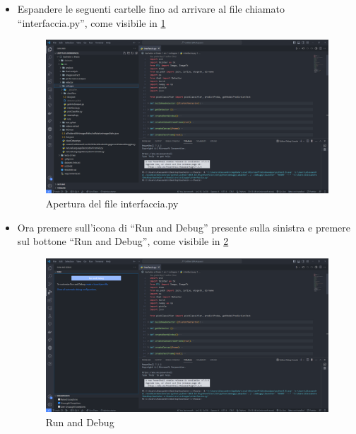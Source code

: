 \begin{itemize}
\item Espandere le seguenti cartelle fino ad arrivare al file chiamato “interfaccia.py”, come visibile in \ref{img:5}
\begin{figure}
    \begin{center}    
        \includegraphics[width=0.72\linewidth]{images/image5.png}
        \caption{Apertura del file interfaccia.py}
        \label{img:5}
    \end{center}
\end{figure}
\newpage
\item Ora premere sull’icona di “Run and Debug” presente sulla sinistra e premere sul bottone “Run and Debug”, come visibile in \ref{img:6}
\begin{figure}
    \begin{center}    
        \includegraphics[width=0.72\linewidth]{images/image6.png}
        \caption{Run and Debug}
        \label{img:6}
    \end{center}
\end{figure}



\end{itemize}
